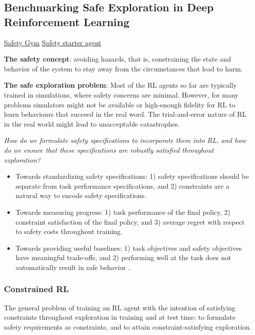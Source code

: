 \subsection{Benchmarking Safe Exploration in Deep Reinforcement Learning \citep{Ray_2019}}

\href{https://openai.com/blog/safety-gym/}{Safety Gym} \href{https://github.com/openai/safety-starter-agents}{Safety starter agent}

\textbf{The safety concept}: avoiding hazards, that is, constraining the state and behavior of the system to stay away from the circumstances that lead to harm.

\textbf{The safe exploration problem}: Most of the RL agents so far are typically trained in simulations, where safety concerns are minimal. However, for many problems simulators might not be available or high-enough fidelity for RL to learn behaviours  that succeed in the real word. The trial-and-error nature of RL in the real world might lead to unacceptable catastrophes.

\emph{ How do we formulate safety specifications to incorporate them into RL, and how do we ensure that these specifications are robustly satisfied throughout exploration?}

\begin{itemize}
\item
Towards standardizing safety specifications: 1) safety specifications should be separate from task performance specifications, and 2) constraints are a natural way to encode safety specifications.
\item
Towards measuring progress: 1) task performance of the final policy, 2) constraint satisfaction of the final policy, and 3) average regret with respect to safety costs throughout training.
\item
Towards providing useful baselines: 1) task objectives and safety objectives have meaningful trade-offs, and 2) performing well at the task does not automatically result in safe behavior \citep{Achiam_2017}.
\end{itemize}

%
\subsubsection{Constrained RL}
The general problem of training an RL agent with the intention of satisfying constraints throughout exploration in training and at test time: to formulate safety requirements as constraints, and to attain constraint-satisfying exploration.

